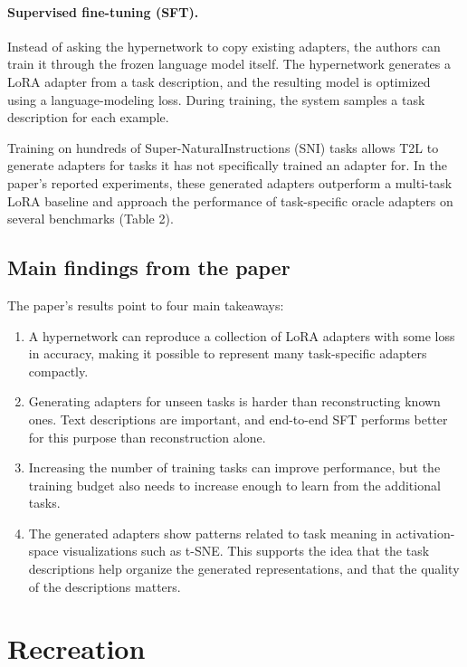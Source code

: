 \documentclass{article}
\begin{document}
\paragraph{Supervised fine-tuning (SFT).}
Instead of asking the hypernetwork to copy existing adapters, the authors can train it through the frozen language model itself. The hypernetwork generates a LoRA adapter from a task description, and the resulting model is optimized using a language-modeling loss. During training, the system samples a task description for each example.

Training on hundreds of Super-NaturalInstructions (SNI) tasks \cite{wang2022sni} allows T2L to generate adapters for tasks it has not specifically trained an adapter for. In the paper's reported experiments, these generated adapters outperform a multi-task LoRA baseline and approach the performance of task-specific oracle adapters on several benchmarks (Table 2).

\subsection{Main findings from the paper}

The paper's results point to four main takeaways:

\begin{enumerate}
  \item A hypernetwork can reproduce a collection of LoRA adapters with some loss in accuracy, making it possible to represent many task-specific adapters compactly.
  \item Generating adapters for unseen tasks is harder than reconstructing known ones. Text descriptions are important, and end-to-end SFT performs better for this purpose than reconstruction alone.
  \item Increasing the number of training tasks can improve performance, but the training budget also needs to increase enough to learn from the additional tasks.
  \item The generated adapters show patterns related to task meaning in activation-space visualizations such as t-SNE. This supports the idea that the task descriptions help organize the generated representations, and that the quality of the descriptions matters.
\end{enumerate}

\section{Recreation}
\end{document}
